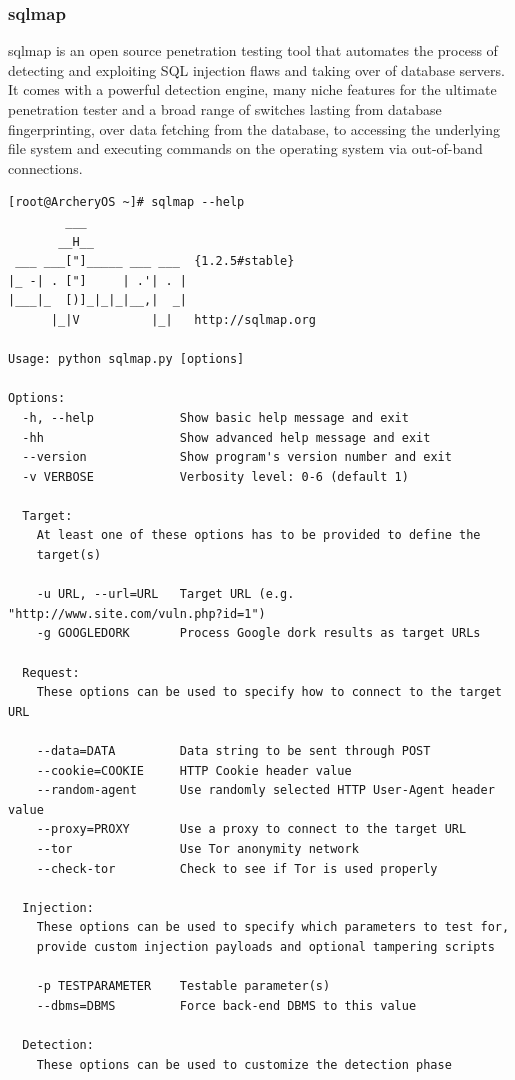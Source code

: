 \documentclass{article}
\begin{document}
\subsubsection{sqlmap}
sqlmap is an open source penetration testing tool that automates the process of detecting and exploiting SQL injection flaws and taking over of database servers. It comes with a powerful detection engine, many niche features for the ultimate penetration tester and a broad range of switches lasting from database fingerprinting, over data fetching from the database, to accessing the underlying file system and executing commands on the operating system via out-of-band connections.
\begin{lstlisting}
[root@ArcheryOS ~]# sqlmap --help
        ___
       __H__
 ___ ___["]_____ ___ ___  {1.2.5#stable}
|_ -| . ["]     | .'| . |
|___|_  [)]_|_|_|__,|  _|
      |_|V          |_|   http://sqlmap.org

Usage: python sqlmap.py [options]

Options:
  -h, --help            Show basic help message and exit
  -hh                   Show advanced help message and exit
  --version             Show program's version number and exit
  -v VERBOSE            Verbosity level: 0-6 (default 1)

  Target:
    At least one of these options has to be provided to define the
    target(s)

    -u URL, --url=URL   Target URL (e.g. "http://www.site.com/vuln.php?id=1")
    -g GOOGLEDORK       Process Google dork results as target URLs

  Request:
    These options can be used to specify how to connect to the target URL

    --data=DATA         Data string to be sent through POST
    --cookie=COOKIE     HTTP Cookie header value
    --random-agent      Use randomly selected HTTP User-Agent header value
    --proxy=PROXY       Use a proxy to connect to the target URL
    --tor               Use Tor anonymity network
    --check-tor         Check to see if Tor is used properly

  Injection:
    These options can be used to specify which parameters to test for,
    provide custom injection payloads and optional tampering scripts

    -p TESTPARAMETER    Testable parameter(s)
    --dbms=DBMS         Force back-end DBMS to this value

  Detection:
    These options can be used to customize the detection phase


\end{lstlisting}
\end{document}
